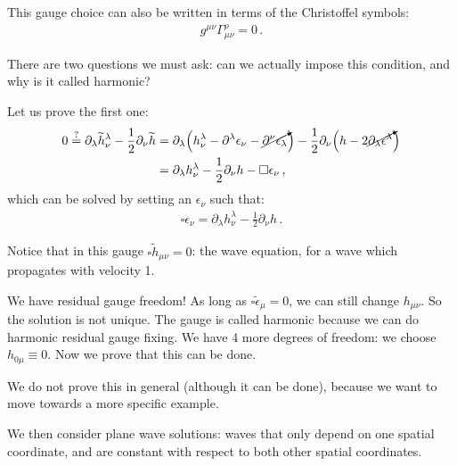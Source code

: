 \documentclass[main.tex]{subfiles}
\begin{document}
\begin{bluebox}
This gauge choice can also be written in terms of the Christoffel symbols: 
%
\begin{align}
g^{\mu \nu } \Gamma^{\rho }_{\mu \nu } = 0
\,.
\end{align}
%
\end{bluebox}

There are two questions we must ask: can we actually impose this condition, and why is it called harmonic? 

Let us prove the first one: 
%
\begin{subequations}
\begin{align}
0 \overset{?}{=} \partial_{\lambda } \widetilde{h}^{\lambda }_{\nu } - \frac{1}{2} \partial_{\nu }\widetilde{h}
&= \partial_{\lambda } \qty( h^{\lambda }_{\nu } - \partial^{\lambda } \epsilon_{\nu } - \cancelto{}{\partial^{\nu } \epsilon_{\lambda }} ) - \frac{1}{2} \partial_{\nu } \qty(h - 2 \cancelto{}{\partial_{\lambda } \epsilon^{\lambda }})  \\
&= \partial_{\lambda } h^{\lambda }_{\nu } - \frac{1}{2} \partial_{\nu } h  - \square \epsilon_{\nu }
\,,
\end{align}
\end{subequations}
%
which can be solved by setting an \(\epsilon_{\nu }\) such that:
%
\begin{align}
  \square  \epsilon_{\nu } = \partial_{\lambda } h^{\lambda }_{\nu } - \frac{1}{2} \partial_{\nu } h
\,.
\end{align}

Notice that in this gauge \(\square \widetilde{h}_{\mu \nu } = 0 \): the wave equation, for a wave which propagates with velocity 1. 

We have residual gauge freedom! As long as \(\square \widetilde{\epsilon}_{\mu} = 0\), we can still change \(h_{\mu \nu }\).
So the solution is not unique. The gauge is called harmonic because we can do harmonic residual gauge fixing. 
We have 4 more degrees of freedom: we choose \(h_{0 \mu } \equiv 0\). Now we prove that this can be done. 

We do not prove this in general (although it can be done), because we want to move towards a more specific example. 

We then consider plane wave solutions: waves that only depend on one spatial coordinate, and are constant with respect to both other spatial coordinates. 
\end{document}

